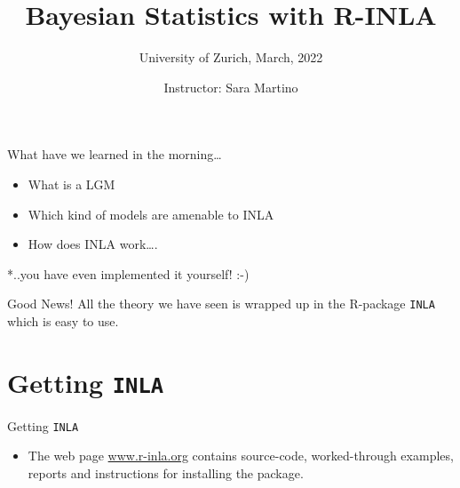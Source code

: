 \documentclass[
  ignorenonframetext,
]{beamer}
\title{Bayesian Statistics with R-INLA}
\subtitle{University of Zurich, March, 2022}
\author{Instructor: Sara Martino}
\date{}
\institute{Department of Mathematical Science (NTNU)}
\providecommand{\tightlist}{%
  \setlength{\itemsep}{0pt}\setlength{\parskip}{0pt}}
\begin{document}
\frame{\titlepage}

\begin{frame}[allowframebreaks]
  \tableofcontents[hideallsubsections]
\end{frame}
\begin{frame}
\end{frame}

\begin{frame}{What have we learned in the morning\ldots{}}
\protect\hypertarget{what-have-we-learned-in-the-morning}{}
\begin{itemize}
\item
  What is a LGM
\item
  Which kind of models are amenable to INLA
\item
  How does INLA work\ldots.
\end{itemize}

\pause

*..you have even implemented it yourself! :-)
\end{frame}

\begin{frame}[fragile]{Good News!}
\protect\hypertarget{good-news}{}
\hfill\break
\hfill\break
\centering All the theory we have seen is wrapped up in the R-package
\texttt{INLA} which is easy to use.
\end{frame}

\hypertarget{getting-inla}{%
\section{\texorpdfstring{Getting
\texttt{INLA}}{Getting INLA}}\label{getting-inla}}

\begin{frame}{Getting \texttt{INLA}}
\protect\hypertarget{getting-inla-1}{}
\begin{itemize}
\tightlist
\item
  The web page \textcolor{red}{\url{www.r-inla.org}} contains
  source-code, worked-through examples, reports and instructions for
  installing the package.
\end{itemize}
\end{frame}
\end{document}

